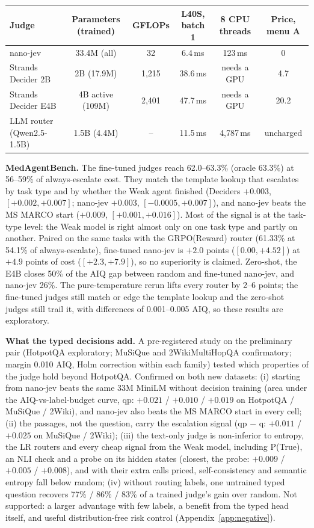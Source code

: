 \documentclass{article}
\begin{document}
\begin{table}[h]
\vspace{2mm}
\begin{tabular}{@{}lccccc@{}}
\toprule
Judge & Parameters (trained) & GFLOPs & L40S, batch 1 & 8 CPU threads & Price, menu A\\
\midrule
nano-jev & 33.4M (all) & 32 & 6.4\,ms & 123\,ms & 0\\
Strands Decider 2B & 2B (17.9M) & 1,215 & 38.6\,ms & needs a GPU & 4.7\\
Strands Decider E4B & 4B active (109M) & 2,401 & 47.7\,ms & needs a GPU & 20.2\\
LLM router (Qwen2.5-1.5B) & 1.5B (4.4M) & -- & 11.5\,ms & 4,787\,ms & uncharged\\
\bottomrule
\end{tabular}
\end{table}

\textbf{MedAgentBench.} The fine-tuned judges reach 62.0--63.3\% (oracle 63.3\%) at 56--59\% of always-escalate cost. They match the template lookup that escalates by task type and by whether the Weak agent finished (Deciders $+0.003$, $[+0.002, +0.007]$; nano-jev $+0.003$, $[-0.0005, +0.007]$), and nano-jev beats the MS MARCO start ($+0.009$, $[+0.001, +0.016]$). Most of the signal is at the task-type level: the Weak model is right almost only on one task type and partly on another. Paired on the same tasks with the GRPO(Reward) router (61.33\% at 54.1\% of always-escalate), fine-tuned nano-jev is $+2.0$ points ($[0.00, +4.52]$) at $+4.9$ points of cost ($[+2.3, +7.9]$), so no superiority is claimed. Zero-shot, the E4B closes 50\% of the AIQ gap between random and fine-tuned nano-jev, and nano-jev 26\%. The pure-temperature rerun lifts every router by 2--6 points; the fine-tuned judges still match or edge the template lookup and the zero-shot judges still trail it, with differences of 0.001--0.005 AIQ, so these results are exploratory.

\textbf{What the typed decisions add.} A pre-registered study on the preliminary pair (HotpotQA exploratory; MuSiQue \citep{trivedi2022musique} and 2WikiMultiHopQA \citep{ho2020constructing} confirmatory; margin 0.010 AIQ, Holm correction within each family) tested which properties of the judge hold beyond HotpotQA. Confirmed on both new datasets: (i) starting from nano-jev beats the same 33M MiniLM without decision training (area under the AIQ-vs-label-budget curve, qp: $+0.021$ / $+0.010$ / $+0.019$ on HotpotQA / MuSiQue / 2Wiki), and nano-jev also beats the MS MARCO start \citep{bajaj2016msmarco} in every cell; (ii) the passages, not the question, carry the escalation signal (qp $-$ q: $+0.011$ / $+0.025$ on MuSiQue / 2Wiki); (iii) the text-only judge is non-inferior to entropy, the LR routers and every cheap signal from the Weak model, including P(True), an NLI check and a probe on its hidden states (closest, the probe: $+0.009$ / $+0.005$ / $+0.008$), and with their extra calls priced, self-consistency and semantic entropy fall below random; (iv) without routing labels, one untrained typed question recovers 77\% / 86\% / 83\% of a trained judge's gain over random. Not supported: a larger advantage with few labels, a benefit from the typed head itself, and useful distribution-free risk control (Appendix~\ref{app:negative}).
\end{document}
